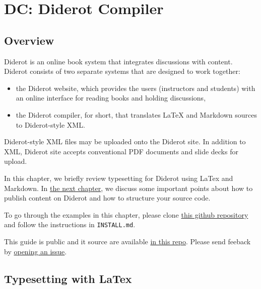 \chapter{DC: Diderot Compiler}
\label{ch:dc}
 

\section{Overview}

Diderot is an online book system that integrates discussions with
content.  Diderot consists of two separate systems that are
designed to work together:
%
\begin{itemize}
\item the Diderot website, which
provides the users (instructors and students) with an online interface
for reading books and holding discussions, 
\item the Diderot
compiler,  for short, that translates LaTeX and Markdown
sources to Diderot-style XML.
\end{itemize}
%
Diderot-style XML files may be uploaded onto the Diderot site. 
%
In addition to XML, Diderot site accepts conventional PDF documents
and slide decks for upload. 
%

In this chapter, we briefly review typesetting for Diderot using LaTex and Markdown.
%
In \href{ch:publish}{the next chapter}, we discuss some important points about how to publish content on Diderot and how to structure your source code.

\begin{important}
To go through the examples in this chapter, please clone 
%
\href{https://github.com/diderot-edu/diderot-guide}{this github repository}
%
and follow the instructions in \lstinline`INSTALL.md`. 

This guide is public and it source are available 
\href{https://github.com/diderot-edu/diderot-guide}{in this repo}.
%
Please send feeback by \href{https://github.com/diderot-edu/diderot-guide/issues}{opening an issue}.
\end{important}


\section{Typesetting with LaTex}

